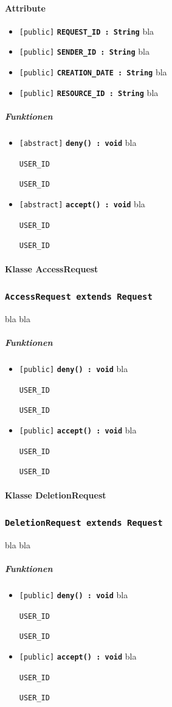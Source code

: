 \documentclass[parskip=full,11pt]{scrartcl}
\makeatletter
\newcommand{\lstInline}[2][,]{%
	\begingroup%
	\lstset{#1}%
	\begin{lrbox}{\mylisting}\lstinline!#2!\end{lrbox}%
	\setlength{\@tempdima}{\linegoal}%
	\ifdim\wd\mylisting>\@tempdima\hfill\\\fi%
	\lstinline!#2!%
	\endgroup%
}
\newcommand{\class}[1]{\subsubsection*{\lstinline[basicstyle=\ttfamily\large]{#1}}}
\newcommand{\atr}[4]{\lstinline{[#3]} \textbf{\lstinline{#1 : #2}} \newline #4}
\newcommand{\mtd}[5]{\lstinline{[#4]} \textbf{\lstinline{#1(#3) : #2}} \newline #5}
\newcommand{\inlinecode}[1]{\lstInline[breaklines=true]{#1}}
\makeatother
\begin{document}
\paragraph*{Attribute} %
\begin{itemize}
	\item \atr{REQUEST_ID}{String}{public}{
	bla 
	}
		\item \atr{SENDER_ID}{String}{public}{
	bla 
	}
		\item \atr{CREATION_DATE}{String}{public}{
	bla 
	}
		\item \atr{RESOURCE_ID}{String}{public}{
	bla 
	}
\end{itemize}
\subparagraph*{Funktionen}  %
\begin{itemize}
	\item \mtd{deny}{void}{}{abstract}{
	bla  \inlinecode{USER_ID}
	}
	
	\item \mtd{accept}{void}{}{abstract}{
	bla  \inlinecode{USER_ID}
	}
\end{itemize}

  \paragraph*{Klasse AccessRequest}
 \class{AccessRequest extends Request}
 bla bla
 
\subparagraph*{Funktionen}  %
\begin{itemize}
	\item \mtd{deny}{void}{}{public}{
	bla  \inlinecode{USER_ID}
	}
	
	\item \mtd{accept}{void}{}{public}{
	bla  \inlinecode{USER_ID}
	}
\end{itemize}

  \paragraph*{Klasse DeletionRequest}
 \class{DeletionRequest extends Request}
 bla bla
 
\subparagraph*{Funktionen}  %
\begin{itemize}
	\item \mtd{deny}{void}{}{public}{
	bla  \inlinecode{USER_ID}
	}
	
	\item \mtd{accept}{void}{}{public}{
	bla  \inlinecode{USER_ID}
	}
\end{itemize}
\end{document}
